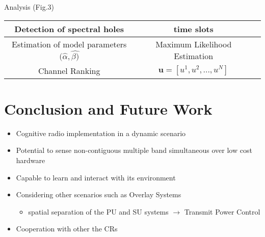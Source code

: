 \documentclass[11pt]{article}
\begin{document}
	Analysis (Fig.3)		\\
	\begin{center}
		\begin{tabular}{|c|c|c|}
		\hline
		Detection of spectral holes &  time slots \\ \hline
		Estimation of model parameters $(\widehat{\alpha}, \widehat{\beta)}$ & Maximum Likelihood Estimation \\ \hline
		Channel Ranking & $\textbf{u} = [u^1,u^2,...,u^N]$	 \\ \hline	
		\end{tabular}
	\end{center}
		
		
	\section*{Conclusion and Future Work}	
			
		\begin{itemize}
			\item Cognitive radio implementation in a dynamic scenario
			\item Potential to sense non-contiguous multiple band simultaneous over low cost hardware		
			\item Capable to learn and interact with its environment
			\item {Considering other scenarios such as Overlay Systems
			\begin{itemize}
				\item spatial separation of the PU and SU systems $\rightarrow$ Transmit Power Control
			\end{itemize}}
			\item Cooperation with other the CRs					
		\end{itemize}	
\end{document}
